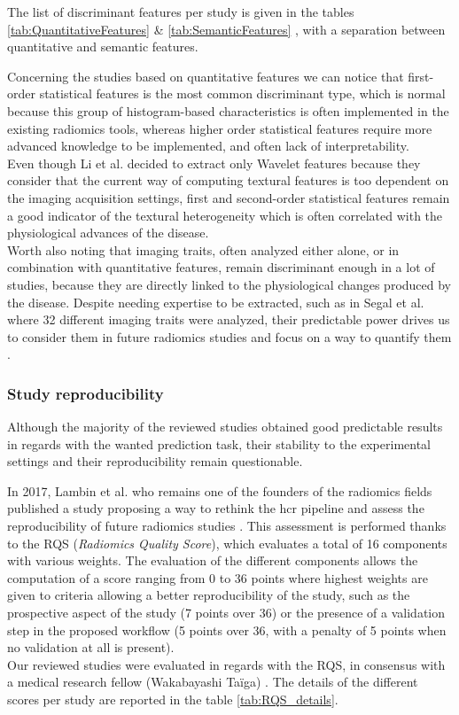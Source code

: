 The list of discriminant features per study is given in the tables \ref{tab:QuantitativeFeatures}
 \& \ref{tab:SemanticFeatures} , with a separation between quantitative and semantic features.



Concerning the studies based on quantitative features we can notice that
first-order statistical features is the most common discriminant type,
which is normal because this group of histogram-based characteristics is
often implemented in the existing radiomics tools, whereas higher order
statistical features require more advanced knowledge to be implemented,
and often lack of interpretability. \\
Even though Li et al. \cite{Li2016} decided to extract only Wavelet features
because they consider that the current way of computing textural
features is too dependent on the imaging acquisition settings, first and
second-order statistical features remain a good indicator of the
textural heterogeneity which is often correlated with the physiological
advances of the disease.\\
Worth also noting that imaging traits, often analyzed either alone, or
in combination with quantitative features, remain discriminant enough in
a lot of studies, because they are directly linked to the physiological
changes produced by the disease. Despite needing expertise to be
extracted, such as in Segal et al. where 32 different imaging
traits were analyzed, their predictable power drives us to consider them
in future radiomics studies and focus on a way to quantify them \cite{Segal2007}.

\subsubsection{Study reproducibility}\label{study-reproducibility}

Although the majority of the reviewed studies obtained good predictable
results in regards with the wanted prediction task, their stability to
the experimental settings and their reproducibility remain questionable.

In 2017, Lambin et al. \cite{Lambin2017} who remains one of the founders of the
radiomics fields \cite{Lambin2012} published a study
proposing a way to rethink the \ac{hcr} pipeline and assess the reproducibility of
future radiomics studies . This
assessment is performed thanks to the RQS (\emph{Radiomics Quality
Score}), which evaluates a total of 16 components with various weights.
The evaluation of the different components allows the computation of a
score ranging from 0 to 36 points where highest weights are given to
criteria allowing a better reproducibility of the study, such as the
prospective aspect of the study (7 points over 36) or the presence of a
validation step in the proposed workflow (5 points over 36, with a
penalty of 5 points when no validation at all is present). \\
Our reviewed studies were evaluated in regards with the RQS, in
consensus with a medical research fellow (Wakabayashi Taïga) \cite{Wakabayashi2019}.
The details of the different scores per study are reported in the table \ref{tab:RQS_details}.

